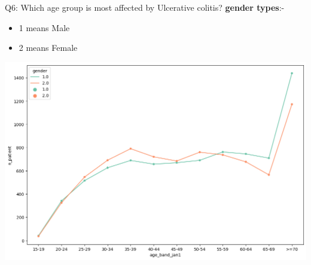 \documentclass[8pt]{beamer}
\begin{document}
        \begin{frame}{Q6: Which age group is most affected by Ulcerative colitis?}
            \textbf{gender types}:-
            \begin{itemize}
                \item 1 means Male
                \item 2 means Female
            \end{itemize}
            \begin{center}
                \includegraphics[height=.75\textheight]{images/uc-age.png}\\
            \end{center}
        \end{frame}
    
\end{document}
